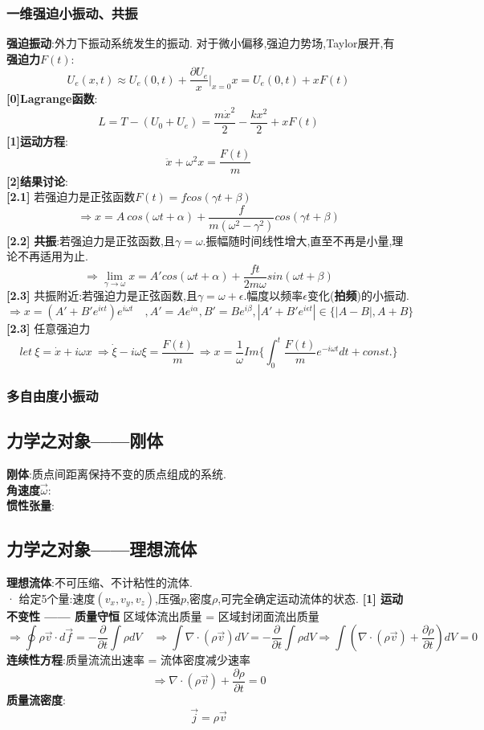 \documentclass{article}
\begin{document}
\subsubsection{一维强迫小振动、共振}
\textbf{强迫振动}:外力下振动系统发生的振动. 对于微小偏移,强迫力势场,Taylor展开,有\\
\textbf{强迫力$F(t)$}:
$$U_e(x,t) \approx U_e(0,t) + \frac{\partial U_e}{x}|_{x=0}x = U_e(0,t) + xF(t)$$
\textbf{[0]Lagrange函数}:
$$L = T - (U_0 + U_e) = \frac{m \dot x^2}{2} - \frac{k x^2}{2} + xF(t)$$
\textbf{[1]运动方程}:
$$\ddot x + \omega^2 x = \frac{F(t)}{m}$$
\textbf{[2]结果讨论}:\\
\textbf{[2.1]} 若强迫力是正弦函数$F(t) = f cos(\gamma t + \beta)$
$$\Rightarrow x = A\ cos(\omega t + \alpha) + \frac{f}{m(\omega^2 - \gamma^2)} cos(\gamma t + \beta)$$
\textbf{[2.2]} \textbf{共振}:若强迫力是正弦函数,且$\gamma = \omega$.\quad 振幅随时间线性增大,直至不再是小量,理论不再适用为止.
$$\Rightarrow \lim_{\gamma \to \omega}x = A'cos(\omega t + \alpha) + \frac{f t}{2m\omega} sin(\omega t + \beta)$$
\textbf{[2.3]} 共振附近:若强迫力是正弦函数,且$\gamma = \omega + \epsilon$.\quad 幅度以频率$\epsilon$变化(\textbf{拍频})的小振动.
$$\Rightarrow x = (A' + B' e^{i\epsilon t})e^{i\omega t} \quad ,A' = Ae^{i\alpha},B' = Be^{i\beta},|A' + B' e^{i\epsilon t}| \in \{|A-B|,A+B\} $$
\textbf{[2.3]} 任意强迫力
$$let\ \xi = \dot x + i\omega x\ \Rightarrow \dot \xi - i\omega \xi = \frac{F(t)}{m}  \ \Rightarrow x = \frac{1}{\omega}Im\{\int_0^t \frac{F(t)}{m}e^{-i\omega t}dt + const.\}$$


\subsubsection{多自由度小振动}


\subsection{力学之对象——刚体}
\textbf{刚体}:质点间距离保持不变的质点组成的系统.\\
\textbf{角速度$\vec \omega$}:\\
\textbf{惯性张量}:



\subsection{力学之对象——理想流体}
\textbf{理想流体}:不可压缩、不计粘性的流体.\\
· 给定5个量:速度$(v_x,v_y,v_z)$,压强$p$,密度$\rho$,可完全确定运动流体的状态.
\textbf{[1] 运动不变性 —— 质量守恒}
区域体流出质量 = 区域封闭面流出质量
$$\Rightarrow \oint \rho \vec v \cdot d \vec f = -\frac{\partial}{\partial t}\int \rho dV \quad \Rightarrow \int \nabla \cdot (\rho \vec v) dV  = -\frac{\partial}{\partial t}\int \rho dV \Rightarrow  \int (\nabla \cdot (\rho \vec v) + \frac{\partial \rho}{\partial t}) dV  = 0$$
\textbf{连续性方程}:质量流流出速率 = 流体密度减少速率
$$\Rightarrow \nabla \cdot (\rho \vec v) +  \frac{\partial \rho}{\partial t} = 0$$
\textbf{质量流密度}:
$$\vec j = \rho \vec v$$
\end{document}
